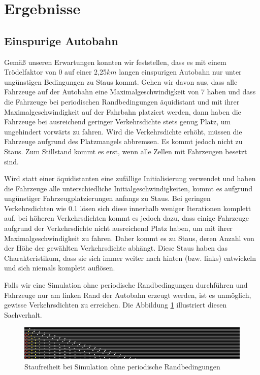 \documentclass[10pt, a4paper]{article}
\begin{document}
\section{Ergebnisse}
\label{sec:ergebnisse}

\subsection{Einspurige Autobahn}
\label{subsec:einspurig}

Gemäß unseren Erwartungen konnten wir feststellen, dass es mit einem Trödelfaktor von 0 auf einer 2,25$km$ langen einspurigen Autobahn nur unter ungünstigen Bedingungen zu Staus kommt. Gehen wir davon aus, dass alle Fahrzeuge auf der Autobahn eine Maximalgeschwindigkeit von 7 haben und dass die Fahrzeuge bei periodischen Randbedingungen äquidistant und mit ihrer Maximalgeschwindigkeit auf der Fahrbahn platziert werden, dann haben die Fahrzeuge bei ausreichend geringer Verkehrsdichte stets genug Platz, um ungehindert vorwärts zu fahren. Wird die Verkehrsdichte erhöht, müssen die Fahrzeuge aufgrund des Platzmangels abbremsen. Es kommt jedoch nicht zu Staus. Zum Stillstand kommt es erst, wenn alle Zellen mit Fahrzeugen besetzt sind.

Wird statt einer äquidistanten eine zufällige Initialisierung verwendet und haben die Fahrzeuge alle unterschiedliche Initialgeschwindigkeiten, kommt es aufgrund ungünstiger Fahrzeugplatzierungen anfangs zu Staus. Bei geringen Verkehrsdichten wie 0.1 lösen sich diese innerhalb weniger Iterationen komplett auf, bei höheren Verkehrsdichten kommt es jedoch dazu, dass einige Fahrzeuge aufgrund der Verkehrsdichte nicht ausreichend Platz haben, um mit ihrer Maximalgeschwindigkeit zu fahren. Daher kommt es zu Staus, deren Anzahl von der Höhe der gewählten Verkehrsdichte abhängt. Diese Staus haben das Charakteristikum, dass sie sich immer weiter nach hinten (bzw. links) entwickeln und sich niemals komplett auflösen.

Falls wir eine Simulation ohne periodische Randbedingungen durchführen und Fahrzeuge nur am linken Rand der Autobahn erzeugt werden, ist es unmöglich, gewisse Verkehrsdichten zu erreichen. Die Abbildung \ref{fig:ergEinspurigKeinWraparoundKeinStau} illustriert diesen Sachverhalt.

\begin{figure}[h!]
	\centering
	\includegraphics[width=\textwidth]{img/erg_einspurig_kein_wraparound_dichte_0_5}
	\caption{Staufreiheit bei Simulation ohne periodische Randbedingungen}
	\label{fig:ergEinspurigKeinWraparoundKeinStau}
\end{figure}
\end{document}
